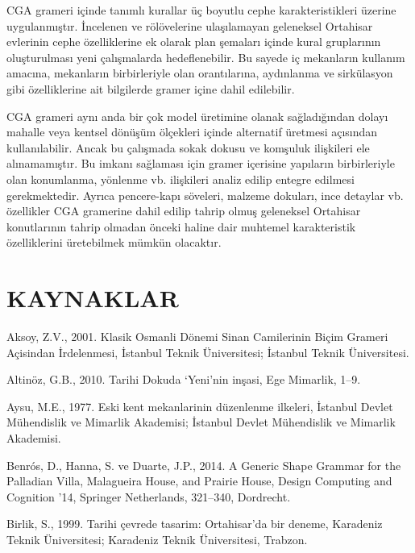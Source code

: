 \documentclass[12pt,turkish,a4paperpaper,]{report}
\begin{document}
CGA grameri içinde tanımlı kurallar üç boyutlu cephe karakteristikleri
üzerine uygulanmıştır. İncelenen ve rölövelerine ulaşılamayan geleneksel
Ortahisar evlerinin cephe özelliklerine ek olarak plan şemaları içinde
kural gruplarının oluşturulması yeni çalışmalarda hedeflenebilir. Bu
sayede iç mekanların kullanım amacına, mekanların birbirleriyle olan
orantılarına, aydınlanma ve sirkülasyon gibi özelliklerine ait
bilgilerde gramer içine dahil edilebilir.

CGA grameri aynı anda bir çok model üretimine olanak sağladığından
dolayı mahalle veya kentsel dönüşüm ölçekleri içinde alternatif üretmesi
açısından kullanılabilir. Ancak bu çalışmada sokak dokusu ve komşuluk
ilişkileri ele alınamamıştır. Bu imkanı sağlaması için gramer içerisine
yapıların birbirleriyle olan konumlanma, yönlenme vb. ilişkileri analiz
edilip entegre edilmesi gerekmektedir. Ayrıca pencere-kapı söveleri,
malzeme dokuları, ince detaylar vb. özellikler CGA gramerine dahil
edilip tahrip olmuş geleneksel Ortahisar konutlarının tahrip olmadan
önceki haline dair muhtemel karakteristik özelliklerini üretebilmek
mümkün olacaktır.

\chapter{KAYNAKLAR}

\thispagestyle{empty}

\hypertarget{refs}{}
\leavevmode\hypertarget{ref-Aksoy:2001wz}{}%
Aksoy, Z.V., 2001. Klasik Osmanli Dönemi Sinan Camilerinin Biçim Grameri
Açisindan İrdelenmesi, İstanbul Teknik Üniversitesi; İstanbul Teknik
Üniversitesi.

\leavevmode\hypertarget{ref-Altnoz:2010wm}{}%
Altinöz, G.B., 2010. Tarihi Dokuda `Yeni'nin inşasi, Ege Mimarlik, 1--9.

\leavevmode\hypertarget{ref-Aysu:1977wt}{}%
Aysu, M.E., 1977. Eski kent mekanlarinin düzenlenme ilkeleri, İstanbul
Devlet Mühendislik ve Mimarlik Akademisi; İstanbul Devlet Mühendislik ve
Mimarlik Akademisi.

\leavevmode\hypertarget{ref-Benros:2014bx}{}%
Benrós, D., Hanna, S. ve Duarte, J.P., 2014. A Generic Shape Grammar for
the Palladian Villa, Malagueira House, and Prairie House, Design
Computing and Cognition '14, Springer Netherlands, 321--340, Dordrecht.

\leavevmode\hypertarget{ref-Birlik:1999ux}{}%
Birlik, S., 1999. Tarihi çevrede tasarim: Ortahisar'da bir deneme,
Karadeniz Teknik Üniversitesi; Karadeniz Teknik Üniversitesi, Trabzon.
\end{document}

